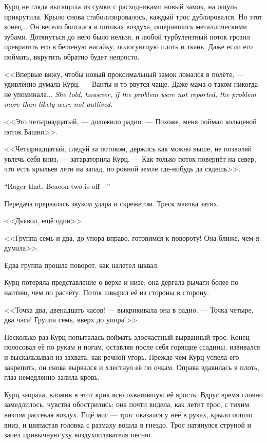 \documentclass[a4paper,10pt,fleqn]{book}\usepackage{polyglossia}\setdefaultlanguage{english}\setotherlanguage{russian}\defaultfontfeatures{Ligatures=TeX,Mapping=tex-text}\usepackage{xcolor}\definecolor{lightgray}{HTML}{bbbbbb}\color{lightgray}\newcommand{\ml}[3]{\textcolor{black}{#3}}
\begin{document}
Курц не глядя вытащила из сумки с расходниками новый замок, на ощупь прикрутила.
Крыло снова стабилизировалось, каждый трос дублировался.
Но этот конец...
Он весело болтался в потоках воздуха, ощерившись металлическими зубами.
Дотянуться до него было нельзя, и любой турбулентный поток грозил превратить его в бешеную нагайку, полосующую плоть и ткань.
Даже если его поймать, вкрутить обратно будет непросто.

<<Впервые вижу, чтобы новый проксимальный замок ломался в полёте, --- удивлённо думала Курц.
--- Ванты и то рвутся чаще.
Даже мама о таком никогда не упоминала...
\ml{$0$}
{Впрочем, она говорила, что если о проблеме никто не сообщал --- вполне вероятно, что проблему никто не пережил>>.}
{\textit{She told, however, if the problem were not reported, the problem more than likely were not outlived.}}

<<Это четырнадцатый, --- доложило радио.
--- Похоже, меня поймал кольцевой поток Башни>>.

<<Четырнадцатый, следуй за потоком, держись как можно выше, не позволяй увлечь себя вниз, --- затараторила Курц.
--- Как только поток повернёт на север, что есть крыльев лети на запад, по ровной земле где-нибудь да сядешь>>.

\ml{$0$}
{<<Понял.}
{``Roger that.}
\ml{$0$}
{Ориентир два --- отбой...>>}
{Beacon two is off---''}

Передача прервалась звуком удара и скрежетом.
Треск маячка затих.

<<Дьявол, ещё один>>.

<<Группа семь и два, до упора вправо, готовимся к повороту!
Она ближе, чем я думала>>.

Едва группа прошла поворот, как налетел шквал.

Курц потеряла представление о верхе и низе;
она дёргала рычаги более по наитию, чем по расчёту.
Поток швырял её из стороны в сторону.

<<Точка два, двенадцать часов! --- выкрикивала она в радио.
--- Точка четыре, два часа!
Группа семь, вверх до упора!>>

Несколько раз Курц попыталась поймать злосчастный вырванный трос.
Конец полосовал её по рукам и ногам, оставляя после себя горящие ссадины, извивался и выскальзывал из захвата, как речной угорь.
Прежде чем Курц успела его закрепить, он снова вырвался и хлестнул её по очкам.
Оправа вдавилась в плоть, глаз немедленно залила кровь.

Курц заорала, вложив в этот крик всю охватившую её ярость.
Вдруг время словно замедлилось, чувства обострились;
она почти видела, как летит трос, с тихим визгом рассекая воздух.
Ещё миг --- трос оказался у неё в руках, крыло пошло вниз, и шипастая головка с размаху вошла в гнездо.
Трос натянулся струной и запел привычную уху воздухоплавателя песню.
\end{document}
